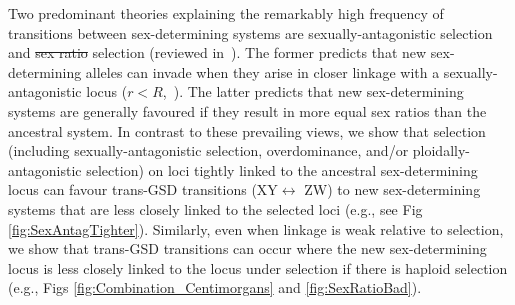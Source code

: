 \documentclass[10pt,letterpaper]{article}
\providecommand{\DIFaddtex}[1]{{\protect\color{blue}\uwave{#1}}} %
\providecommand{\DIFdeltex}[1]{{\protect\color{red}\sout{#1}}}                      %
\providecommand{\DIFaddbegin}{} %
\providecommand{\DIFaddend}{} %
\providecommand{\DIFdelbegin}{} %
\providecommand{\DIFdelend}{} %
\providecommand{\DIFadd}[1]{\texorpdfstring{\DIFaddtex{#1}}{#1}} %
\providecommand{\DIFdel}[1]{\texorpdfstring{\DIFdeltex{#1}}{}} %
\newcommand{\DIFscaledelfig}{0.5}
\newlength{\DIFdelgraphicswidth} %
\newlength{\DIFdelgraphicsheight} %
\newcommand{\DIFaddincludegraphics}[2][]{{\color{blue}\fbox{\DIFOincludegraphics[#1]{#2}}}} %
\newcommand{\DIFdelincludegraphics}[2][]{%
\sbox{\DIFdelgraphicsbox}{\DIFOincludegraphics[#1]{#2}}%
\settoboxwidth{\DIFdelgraphicswidth}{\DIFdelgraphicsbox} %
\settoboxtotalheight{\DIFdelgraphicsheight}{\DIFdelgraphicsbox} %
\scalebox{\DIFscaledelfig}{%
\parbox[b]{\DIFdelgraphicswidth}{\usebox{\DIFdelgraphicsbox}\\[-\baselineskip] \rule{\DIFdelgraphicswidth}{0em}}\llap{\resizebox{\DIFdelgraphicswidth}{\DIFdelgraphicsheight}{%
\setlength{\unitlength}{\DIFdelgraphicswidth}%
\begin{picture}(1,1)%
\thicklines\linethickness{2pt} %
{\color[rgb]{1,0,0}\put(0,0){\framebox(1,1){}}}%
{\color[rgb]{1,0,0}\put(0,0){\line( 1,1){1}}}%
{\color[rgb]{1,0,0}\put(0,1){\line(1,-1){1}}}%
\end{picture}%
}\hspace*{3pt}}} %
} %
\DeclareRobustCommand{\DIFaddbegin}{\DIFOaddbegin \let\includegraphics\DIFaddincludegraphics} %
\DeclareRobustCommand{\DIFaddend}{\DIFOaddend \let\includegraphics\DIFOincludegraphics} %
\DeclareRobustCommand{\DIFdelbegin}{\DIFOdelbegin \let\includegraphics\DIFdelincludegraphics} %
\DeclareRobustCommand{\DIFdelend}{\DIFOaddend \let\includegraphics\DIFOincludegraphics} %
\begin{document}
Two predominant theories explaining the remarkably high frequency of transitions between \DIFaddbegin \DIFadd{genetic }\DIFaddend sex-determining systems are sexually-antagonistic selection and \DIFdelbegin \DIFdel{sex ratio }\DIFdelend \DIFaddbegin \DIFadd{sex-ratio }\DIFaddend selection (reviewed in~\cite{Blaser2012, vanDoorn2014re}).
The former predicts that new sex-determining alleles can invade when they arise in closer linkage with a sexually-antagonistic locus ($r<R$,~\cite{vanDoorn:2007eu,vanDoorn:2010hu, Muralidhar2018}).
The latter predicts that new sex-determining systems are generally favoured if they result in more equal sex ratios than the ancestral system. 
In contrast to these prevailing views, we show that selection (including sexually-antagonistic selection, overdominance, and/or ploidally-antagonistic selection) on loci tightly linked to the ancestral sex-determining locus can favour trans-GSD transitions (XY$\leftrightarrow$ ZW) to new sex-determining systems that are less closely linked to the selected loci (e.g., see Fig \ref{fig:SexAntagTighter}). 
Similarly, even when linkage is weak relative to selection, we show that %
trans-GSD transitions can occur where the new sex-determining locus is less closely linked to the locus under selection if there is haploid selection (e.g., Figs \ref{fig:Combination_Centimorgans} and \ref{fig:SexRatioBad}). 
\end{document}
